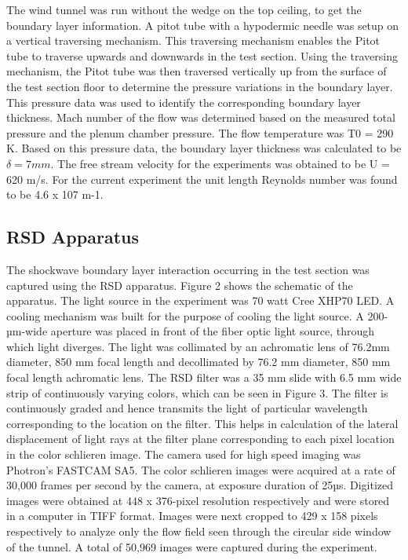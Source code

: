 \documentclass{article}
\begin{document}
	The wind tunnel was run without the wedge on the top ceiling, to get the boundary layer information. A pitot tube with a hypodermic needle was setup on a vertical traversing mechanism. This traversing mechanism enables the Pitot tube to traverse upwards and downwards in the test section. Using the traversing mechanism, the Pitot tube was then traversed vertically up from the surface of the test section floor to determine the pressure variations in the boundary layer. This pressure data was used to identify the corresponding boundary layer thickness. Mach number of the flow was determined based on the measured total pressure and the plenum chamber pressure. The flow temperature was T0 = 290 K. Based on this pressure data, the boundary layer thickness was calculated to be $\delta=7 mm$. The free stream velocity for the experiments was obtained to be U = 620 m/s. For the current experiment the unit length Reynolds number was found to be 4.6 x 107 m-1.

\subsection{RSD Apparatus}
The shockwave boundary layer interaction occurring in the test section was captured using the RSD apparatus. Figure 2 shows the schematic of the apparatus. The light source in the experiment was 70 watt Cree XHP70 LED. A cooling mechanism was built for the purpose of cooling the light source. A 200-µm-wide aperture was placed in front of the fiber optic light source, through which light diverges. The light was collimated by an achromatic lens of 76.2mm diameter, 850 mm focal length and decollimated by 76.2 mm diameter, 850 mm focal length achromatic lens.  The RSD filter was a 35 mm slide with 6.5 mm wide strip of continuously varying colors, which can be seen in Figure 3. The filter is continuously graded and hence transmits the light of particular wavelength corresponding to the location on the filter. This helps in calculation of the lateral displacement of light rays at the filter plane corresponding to each pixel location in the color schlieren image. The camera used for high speed imaging was Photron’s FASTCAM SA5.
	The color schlieren images were acquired at a rate of 30,000 frames per second by the camera, at exposure duration of 25µs. Digitized images were obtained at 448 x 376-pixel resolution respectively and were stored in a computer in TIFF format. Images were next cropped to 429 x 158 pixels respectively to analyze only the flow field seen through the circular side window of the tunnel. A total of 50,969 images were captured during the experiment.
\end{document}
